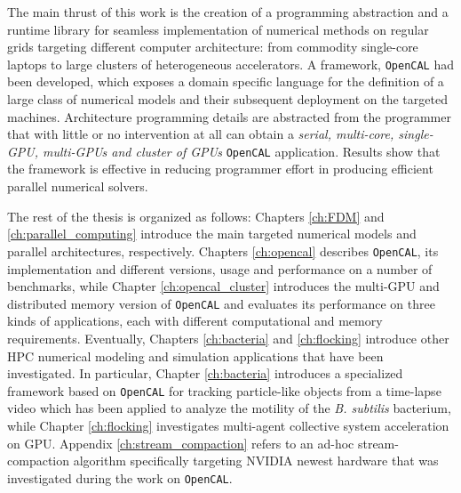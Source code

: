 The main thrust of this work is the creation of a programming abstraction and a runtime library for seamless implementation of numerical methods on regular grids targeting different computer architecture: from commodity single-core laptops to large clusters of heterogeneous accelerators. A framework, \texttt{OpenCAL} had been developed, which exposes a domain specific language for the definition of a large class of numerical models and their subsequent deployment on the targeted machines. Architecture programming details are abstracted from the programmer that with little or no intervention at all can obtain a \textit{serial, multi-core, single-GPU, multi-GPUs and cluster of GPUs} \texttt{OpenCAL} application. 
Results show that the framework is effective in reducing programmer effort in producing efficient parallel numerical solvers.

The rest of the thesis is organized as follows:
Chapters \ref{ch:FDM} and \ref{ch:parallel_computing} introduce the main targeted numerical models and parallel architectures, respectively.
Chapters \ref{ch:opencal}  describes \texttt{OpenCAL}, its implementation and different versions, usage and performance on a number of benchmarks, while Chapter \ref{ch:opencal_cluster} introduces the multi-GPU and distributed memory version of \texttt{OpenCAL} and evaluates its performance on three  kinds of applications, each with different computational and memory requirements.
Eventually, Chapters \ref{ch:bacteria} and  \ref{ch:flocking} introduce other HPC numerical modeling and simulation applications that have been investigated. 
In particular, Chapter \ref{ch:bacteria} introduces a specialized framework based on \texttt{OpenCAL} for tracking particle-like objects from a time-lapse video which has been applied to analyze the motility of the \textit{B. subtilis} bacterium, while Chapter \ref{ch:flocking} investigates multi-agent collective system acceleration on GPU.
Appendix \ref{ch:stream_compaction} refers to an ad-hoc stream-compaction algorithm specifically targeting NVIDIA newest hardware that was investigated during the work on \texttt{OpenCAL}.

